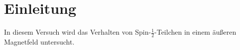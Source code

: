 \section{Einleitung}
In diesem Versuch wird das Verhalten von Spin-$\frac{1}{2}$-Teilchen in einem äußeren Magnetfeld untersucht. 